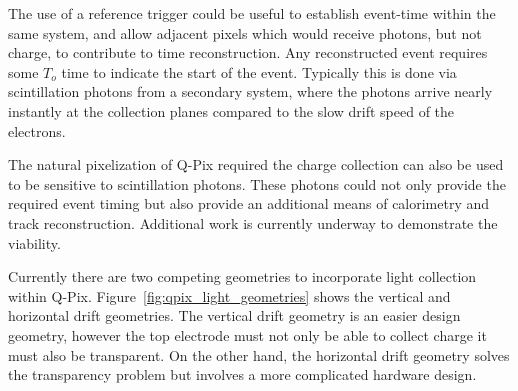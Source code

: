 The use of a reference trigger could be useful to establish event-time within the same system, and allow adjacent pixels which would receive photons, but not charge, to contribute to time reconstruction.
Any reconstructed event requires some $T_{o}$ time to indicate the start of the event.
Typically this is done via scintillation photons from a secondary system, where the photons arrive nearly instantly at the collection planes compared to the slow drift speed of the electrons.

The natural pixelization of Q-Pix required the charge collection can also be used to be sensitive to scintillation photons.
These photons could not only provide the required event timing but also provide an additional means of calorimetry and track reconstruction.
Additional work is currently underway to demonstrate the viability.

Currently there are two competing geometries to incorporate light collection within Q-Pix.
Figure~\ref{fig:qpix_light_geometries} shows the vertical and horizontal drift geometries.
The vertical drift geometry is an easier design geometry, however the top electrode must not only be able to collect charge it must also be transparent. 
On the other hand, the horizontal drift geometry solves the transparency problem but involves a more complicated hardware design. 

